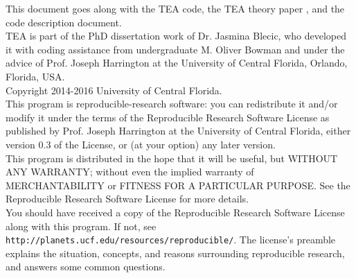 
\vspace*{\fill}
\begin{center}
\begin{minipage}{.8\textwidth}


\vspace{20pt} This document goes along with the TEA code, the TEA theory
paper \citep{BlecicEtal2016-TEAtheory}, and the code description
document.  \\

 TEA is part of the PhD dissertation work of Dr. Jasmina                   
Blecic, who developed it with coding assistance from                       
undergraduate M. Oliver Bowman and under the advice of                     
Prof. Joseph Harrington at the University of Central Florida,              
Orlando, Florida, USA.   \\      

\hspace{60pt} Copyright \textcopyright \hspace{1pt} 2014-2016 University of Central Florida. \\   

This program is reproducible-research software: you can                    
redistribute it and/or modify it under the terms of the                    
Reproducible Research Software License as published by                     
Prof. Joseph Harrington at the University of Central Florida,              
either version 0.3 of the License, or (at your option) any later           
version.  \\   
                                                             
This program is distributed in the hope that it will be useful,            
but WITHOUT ANY WARRANTY; without even the implied warranty of             
MERCHANTABILITY or FITNESS FOR A PARTICULAR PURPOSE.  See the              
Reproducible Research Software License for more details.  \\                 

You should have received a copy of the Reproducible Research               
Software License along with this program.  If not, see                     
{\tt http://planets.ucf.edu/resources/reproducible/}.  The license's           
preamble explains the situation, concepts, and reasons surrounding         
reproducible research, and answers some common questions.  \\                


\end{minipage}
\end{center}
